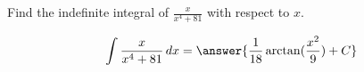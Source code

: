 \documentclass{ximera}
\author{Gregory Hartman \and Matthew Carr}
\begin{document}
\begin{exercise}

Find the indefinite integral of $\frac{x}{x^4+81}$ with respect to $x$.

\[
\int \frac{x}{x^4+81}\d x=\answer{\frac{1}{18}\arctan(\frac{x^2}{9})+C}
\]

\end{exercise}
\end{document}
